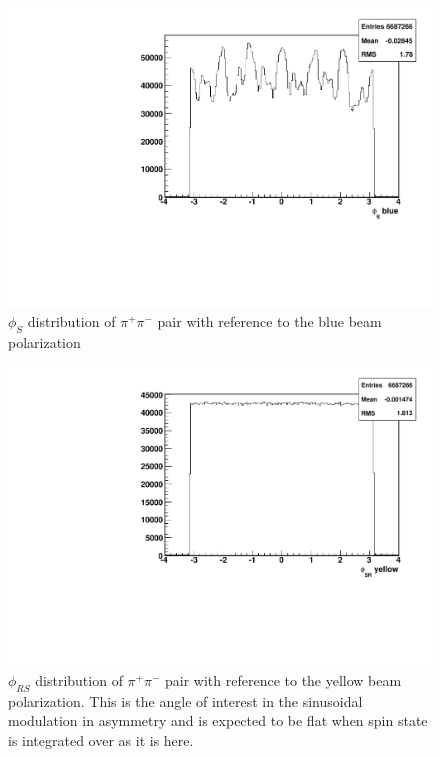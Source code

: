 \documentclass[letterpaper, abstract = on,listof=totoc, bibliography=totoc]{scrreprt}
\newcommand{\phis}{\phi_{S}}
\newcommand{\phirs}{\phi_{RS}}
\newcommand{\pip}{\pi^+}
\newcommand{\pim}{\pi^-}
\newcommand{\pair}{$\pip\pim$ }
\begin{document}
\begin{figure}
\begin{center}
\includegraphics[width = .8\textwidth]{hPhiSb}
\caption[$\phis$ distribution of \pair pair with reference to the blue beam polarization]{$\phis$ distribution of \pair pair with reference to the blue beam polarization}
\label{fig:phisb}
\end{center}
\end{figure}


\begin{figure}
\begin{center}
\includegraphics[width = .8\textwidth]{hPhiSRy}
\caption[$\phirs$ distribution of \pair pair with reference to the yellow beam polarization]{$\phirs$ distribution of \pair pair with reference to the yellow beam polarization. This is the angle of interest in the sinusoidal modulation in asymmetry and is expected to be flat when spin state is integrated over as it is here.}
\label{fig:phisry}
\end{center}
\end{figure}
\end{document}
